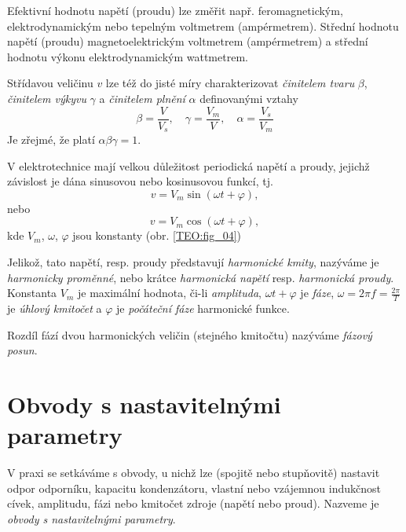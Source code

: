{    Efektivní hodnotu napětí (proudu) lze změřit např. feromagnetickým, elektrodynamickým nebo
    tepelným voltmetrem (ampérmetrem). Střední hodnotu napětí (proudu) magnetoelektrickým
    voltmetrem (ampérmetrem) a střední hodnotu výkonu elektrodynamickým wattmetrem.
 
          
         
    Střídavou veličinu $v$ lze též do jisté míry charakterizovat \emph{činitelem tvaru} $\beta$,
    \emph{činitelem výkyvu} $\gamma$ a \emph{činitelem plnění} $\alpha$ definovanými vztahy
    \begin{equation}\label{TEO:eq_harm07}
      \beta = \frac{V}{V_s}, \quad \gamma = \frac{V_m}{V}, \quad \alpha = \frac{V_s}{V_m}
    \end{equation}    
    Je zřejmé, že platí $\alpha\beta\gamma = 1$.
    
    V elektrotechnice mají velkou důležitost periodická napětí a proudy, jejichž závislost je dána
    sinusovou nebo kosinusovou funkcí, tj.
    \begin{equation}\label{TEO:eq_harm08}
      v = V_m\sin(\omega t + \varphi),
    \end{equation}        
    nebo
    \begin{equation}\label{TEO:eq_harm09}
      v = V_m\cos(\omega t + \varphi),
    \end{equation}  
    kde $V_m$, $\omega$, $\varphi$ jsou konstanty (obr. \ref{TEO:fig_04})
    
    Jelikož, tato napětí, resp. proudy představují \emph{harmonické kmity}, nazýváme je
    \emph{harmonicky proměnné}, nebo krátce \emph{harmonická napětí} resp. \emph{harmonická
    proudy}. Konstanta $V_m$ je maximální hodnota, či-li \emph{amplituda}, $\omega t + \varphi$ je
    \emph{fáze}, $\omega = 2\pi f = \frac{2\pi}{T}$ je \emph{úhlový kmitočet} a $\varphi$ je
    \emph{počáteční fáze} harmonické funkce.
    
    Rozdíl fází dvou harmonických veličin (stejného kmitočtu) nazýváme \emph{fázový posun}.
    
      
      
  \section{Obvody s nastavitelnými parametry}
    V praxi se setkáváme s obvody, u nichž lze (spojitě nebo stupňovitě) nastavit odpor odporníku, 
    kapacitu kondenzátoru, vlastní nebo vzájemnou indukčnost cívek, amplitudu, fázi nebo kmitočet
    zdroje (napětí nebo proud). Nazveme je \emph{obvody s nastavitelnými parametry}.

} %
\printbibliography[title={Seznam literatury}, heading=subbibliography]
